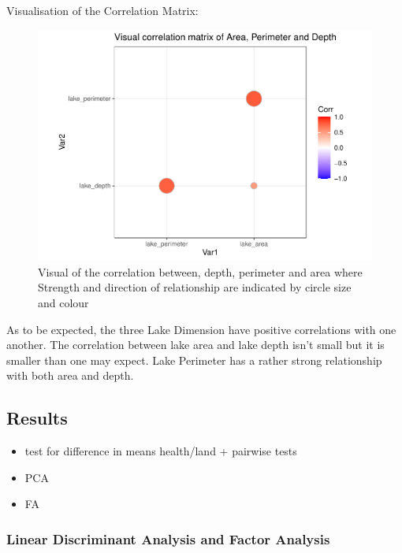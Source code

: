 \documentclass[
]{article}
\providecommand{\tightlist}{%
  \setlength{\itemsep}{0pt}\setlength{\parskip}{0pt}}
\begin{document}
Visualisation of the Correlation Matrix:

\begin{figure}
\centering
\includegraphics{Final-Report_files/figure-latex/VisCorr1-1.pdf}
\caption{\label{fig:VisCorr1}Visual of the correlation between, depth, perimeter and area where Strength and direction of relationship are indicated by circle size and colour}
\end{figure}

As to be expected, the three Lake Dimension have positive correlations with one another. The correlation between lake area and lake depth isn't small but it is smaller than one may expect. Lake Perimeter has a rather strong relationship with both area and depth.

\hypertarget{results}{%
\subsection{Results}\label{results}}

\begin{itemize}
\tightlist
\item
  test for difference in means health/land + pairwise tests
\item
  PCA
\item
  FA
\end{itemize}

\hypertarget{linear-discriminant-analysis-and-factor-analysis}{%
\subsubsection{Linear Discriminant Analysis and Factor Analysis}\label{linear-discriminant-analysis-and-factor-analysis}}
\end{document}
